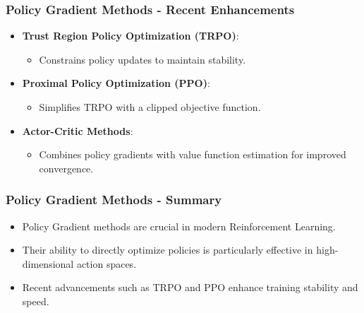 \documentclass[aspectratio=169]{beamer}
\begin{document}
\begin{frame}[fragile]
    \frametitle{Policy Gradient Methods - Recent Enhancements}
    \begin{itemize}
        \item \textbf{Trust Region Policy Optimization (TRPO)}: 
        \begin{itemize}
            \item Constrains policy updates to maintain stability.
        \end{itemize}
        
        \item \textbf{Proximal Policy Optimization (PPO)}: 
        \begin{itemize}
            \item Simplifies TRPO with a clipped objective function.
        \end{itemize}
        
        \item \textbf{Actor-Critic Methods}:
        \begin{itemize}
            \item Combines policy gradients with value function estimation for improved convergence.
        \end{itemize}
    \end{itemize}
\end{frame}

\begin{frame}[fragile]
    \frametitle{Policy Gradient Methods - Summary}
    \begin{itemize}
        \item Policy Gradient methods are crucial in modern Reinforcement Learning.
        \item Their ability to directly optimize policies is particularly effective in high-dimensional action spaces.
        \item Recent advancements such as TRPO and PPO enhance training stability and speed.
    \end{itemize}
\end{frame}
\end{document}
